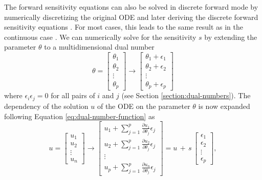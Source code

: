 The forward sensitivity equations can also be solved in discrete forward mode by numerically discretizing the original ODE and later deriving the discrete forward sensitivity equations \cite{ma2021comparison}. 
For most cases, this leads to the same result as in the continuous case \cite{FATODE2014}.
We can numerically solve for the sensitivity $s$ by extending the parameter $\theta$ to a multidimensional dual number %
\begin{equation}
    \theta =
    \begin{bmatrix}
    \theta_1 \\
    \theta_2 \\
    \vdots \\
    \theta_p
    \end{bmatrix}
    \longrightarrow
    \begin{bmatrix}
    \theta_1 + \epsilon_1 \\
    \theta_2 + \epsilon_2 \\
    \vdots \\
    \theta_p + \epsilon_p
    \end{bmatrix}
\end{equation}
where $\epsilon_i \epsilon_j = 0$ for all pairs of $i$ and $j$ (see Section \ref{section:dual-numbers}). 
The dependency of the solution $u$ of the ODE on the parameter $\theta$ is now expanded following Equation \eqref{eq:dual-number-function} as 
\begin{equation}
    u =
    \begin{bmatrix}
    u_1 \\
    u_2 \\
    \vdots \\
    u_n
    \end{bmatrix}
    \longrightarrow
    \begin{bmatrix}
    u_1 + \sum_{j=1}^p \frac{\partial u_1}{\partial \theta_j} \epsilon_j \\
    u_2 + \sum_{j=1}^p \frac{\partial u_2}{\partial \theta_j} \epsilon_j \\
    \vdots \\
    u_p + \sum_{j=1}^p \frac{\partial u_n}{\partial \theta_j} \epsilon_j
    \end{bmatrix}
    = 
    u \, + \, s \, 
    \begin{bmatrix}
    \epsilon_1 \\
    \epsilon_2 \\
    \vdots \\
    \epsilon_p
    \end{bmatrix},
\end{equation}
